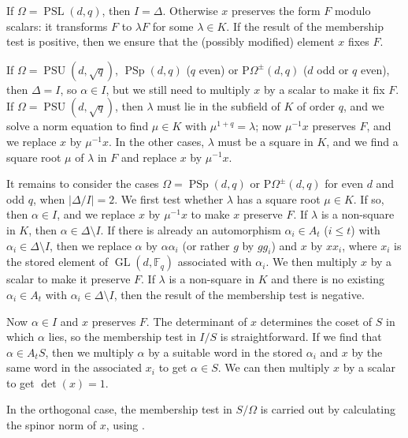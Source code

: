 \documentclass[12pt,twoside,reqno,psamsfonts]{amsproc}
\numberwithin{equation}{section}
\numberwithin{figure}{section}
\theoremstyle{plain}
\theoremstyle{definition}
\theoremstyle{remark}
\newcommand{\field}[1]{\mathbb{#1}}
\newcommand{\F}{\field{F}}
\newcommand{\POm}{\mathrm{P}\Omega}
\DeclareMathOperator{\GL}{GL}
\DeclareMathOperator{\PSU}{PSU}
\DeclareMathOperator{\PSL}{PSL}
\DeclareMathOperator{\PSp}{PSp}
\begin{document}
\vspace{0.1cm}
If $\Omega = \PSL(d,q)$, then $I=\Delta$. 
Otherwise $x$ preserves the form $F$ modulo scalars:
it transforms $F$ to $\lambda F$ for some $\lambda \in K$.
If the result of the membership test is positive, then we ensure that
the (possibly modified) element $x$ fixes $F$.

If $\Omega = \PSU(d, \sqrt{q})$, $\PSp(d,q)$ ($q$ even) or $\POm^{\pm}(d,q)$
($d$ odd or $q$ even), then $\Delta = I$, so %
$\alpha \in I$, but we still need to multiply $x$ by a scalar to make it
fix $F$. If $\Omega = \PSU(d, \sqrt{q})$,  then
$\lambda$ must lie in the subfield of $K$ of order
$q$, and we solve a norm equation to find $\mu \in K$ with
$\mu^{1+q}=\lambda$; now $\mu^{-1}x$ preserves $F$, and we replace $x$ by
$\mu^{-1}x$. In the other cases, $\lambda$ must be a square in $K$,
and we find a square root $\mu$ of $\lambda$ in $F$ and replace
$x$ by $\mu^{-1}x$.

It remains to consider the cases $\Omega = \PSp(d,q)$ or $\POm^{\pm}(d,q)$ for
even $d$ and odd $q$, when $|\Delta/I| = 2$. We first test whether $\lambda$ has
a square root $\mu \in K$. If so, then $\alpha \in I$, and we replace $x$ by
$\mu^{-1}x$ to make $x$ preserve $F$.
If $\lambda$ is a non-square in $K$, then $\alpha \in \Delta \setminus I$.
If there is already an automorphism $\alpha_i \in A_t$ ($i \leqslant t$) with
$\alpha_i \in \Delta \setminus I$, then we replace $\alpha$ by
$\alpha \alpha_i$ (or rather $g$ by $gg_i$) and $x$ by $xx_i$, where
$x_i$ is the stored element of $\GL(d,\F_{q})$ associated with $\alpha_i$.
We then multiply $x$ by a scalar to make it preserve $F$.
If $\lambda$ is a non-square in $K$ and there is no existing
$\alpha_i \in A_t$ with $\alpha_i \in \Delta \setminus I$,
then the result of the membership test is negative.

\vspace{0.1cm}
Now $\alpha \in I$ and $x$ preserves $F$.
The determinant of $x$ determines the coset of $S$ in which $\alpha$
lies, so the membership test in $I/S$ is straightforward. If we find that
$\alpha \in A_tS$, then we multiply $\alpha$ by a suitable word in
the stored $\alpha_i$ and $x$ by the same word in the associated
$x_i$ to get $\alpha \in S$. We can then multiply $x$ by a scalar to get
$\det(x)=1$.

In the orthogonal case, the membership test in $S/\Omega$ is carried out
by calculating the spinor norm of $x$, using \cite{spinornorms}.
\end{document}
